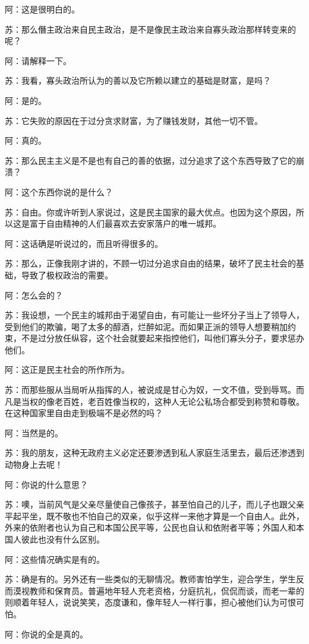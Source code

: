 \documentclass[12pt,oneside]{book}
\begin{document}
阿：这是很明白的。

苏：那么僭主政治来自民主政治，是不是像民主政治来自寡头政治那样转变来的呢？

阿：请解释一下。

苏：我看，寡头政治所认为的善以及它所赖以建立的基础是财富，是吗？

阿：是的。

苏：它失败的原因在于过分贪求财富，为了赚钱发财，其他一切不管。

阿：真的。

苏：那么民主主义是不是也有自己的善的依据，过分追求了这个东西导致了它的崩溃？

阿：这个东西你说的是什么？

苏：自由。你或许听到人家说过，这是民主国家的最大优点。也因为这个原因，所以这是富于自由精神的人们最喜欢去安家落户的唯一城邦。

阿：这话确是听说过的，而且听得很多的。

苏：那么，正像我刚才讲的，不顾一切过分追求自由的结果，破坏了民主社会的基础，导致了极权政治的需要。

阿：怎么会的？

苏：我设想，一个民主的城邦由于渴望自由，有可能让一些坏分子当上了领导人，受到他们的欺骗，喝了太多的醇酒，烂醉如泥。而如果正派的领导人想要稍加约束，不是过分放任纵容，这个社会就要起来指控他们，叫他们寡头分子，要求惩办他们。

阿：这正是民主社会的所作所为。

苏：而那些服从当局听从指挥的人，被说成是甘心为奴，一文不值，受到辱骂。而凡是当权的像老百姓，老百姓像当权的，这种人无论公私场合都受到称赞和尊敬。在这种国家里自由走到极端不是必然的吗？

阿：当然是的。

苏：我的朋友，这种无政府主义必定还要渗透到私人家庭生活里去，最后还渗透到动物身上去呢！

阿：你说的什么意思？

苏：噢，当前风气是父亲尽量使自己像孩子，甚至怕自己的儿子，而儿子也跟父亲平起平坐，既不敬也不怕自己的双亲，似乎这样一来他才算是一个自由人。此外，外来的依附者也认为自己和本国公民平等，公民也自认和依附者平等；外国人和本国人彼此也没有什么区别。

阿：这些情况确实是有的。

苏：确是有的。另外还有一些类似的无聊情况。教师害怕学生，迎合学生，学生反而漠视教师和保育员。普遍地年轻人充老资格，分庭抗礼，侃侃而谈，而老一辈的则顺着年轻人，说说笑笑，态度谦和，像年轻人一样行事，担心被他们认为可恨可怕。

阿：你说的全是真的。
\end{document}
